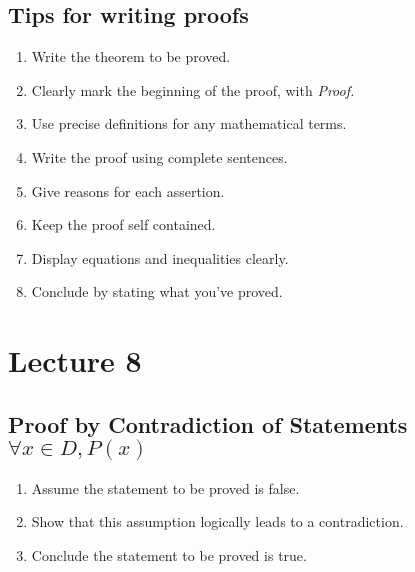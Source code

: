 \documentclass{report}
\begin{document}
\subsection*{Tips for writing proofs}
\begin{enumerate}
	\item Write the theorem to be proved.
	\item Clearly mark the beginning of the proof, with \textit{Proof.}
	\item Use precise definitions for any mathematical terms.
	\item Write the proof using complete sentences.
	\item Give reasons for each assertion.
	\item Keep the proof self contained.
	\item Display equations and inequalities clearly.
	\item Conclude by stating what you've proved.
\end{enumerate}

\section{Lecture 8}
\subsection*{Proof by Contradiction of Statements $\forall x\in D, P(x)$}
\begin{enumerate}
	\item Assume the statement to be proved is false.
	\item Show that this assumption logically leads to a contradiction.
	\item Conclude the statement to be proved is true.
\end{enumerate}

\end{document}
